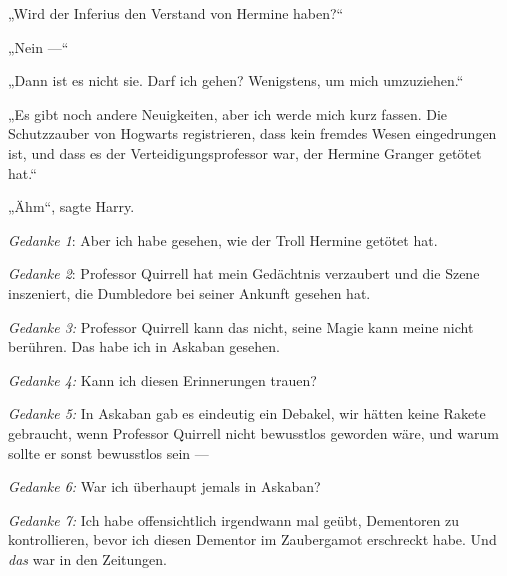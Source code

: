 „Wird der Inferius den Verstand von Hermine haben?“

„Nein —“

„Dann ist es nicht sie. Darf ich gehen? Wenigstens, um mich umzuziehen.“

„Es gibt noch andere Neuigkeiten, aber ich werde mich kurz fassen. Die Schutzzauber von Hogwarts registrieren, dass kein fremdes Wesen eingedrungen ist, und dass es der Verteidigungsprofessor war, der Hermine Granger getötet hat.“

„Ähm“, sagte Harry.

\emph{Gedanke 1}: Aber ich habe gesehen, wie der Troll Hermine getötet hat.

\emph{Gedanke 2}: Professor Quirrell hat mein Gedächtnis verzaubert und die Szene inszeniert, die Dumbledore bei seiner Ankunft gesehen hat.

\emph{Gedanke 3:} Professor Quirrell kann das nicht, seine Magie kann meine nicht berühren. Das habe ich in Askaban gesehen.

\emph{Gedanke 4:} Kann ich diesen Erinnerungen trauen?

\emph{Gedanke 5:} In Askaban gab es eindeutig ein Debakel, wir hätten keine Rakete gebraucht, wenn Professor Quirrell nicht bewusstlos geworden wäre, und warum sollte er sonst bewusstlos sein —

\emph{Gedanke 6:} War ich überhaupt jemals in Askaban?

\emph{Gedanke 7:} Ich habe offensichtlich irgendwann mal geübt, Dementoren zu kontrollieren, bevor ich diesen Dementor im Zaubergamot erschreckt habe. Und \emph{das} war in den Zeitungen.

